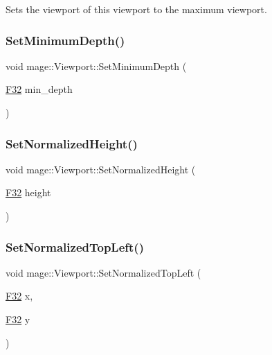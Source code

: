 Sets the viewport of this viewport to the maximum viewport. \hypertarget{classmage_1_1_viewport_a7e5ea28ca50be25d48668bd8ce4995d5}{}\label{classmage_1_1_viewport_a7e5ea28ca50be25d48668bd8ce4995d5} 
\subsubsection{\texorpdfstring{Set\+Minimum\+Depth()}{SetMinimumDepth()}}
{\footnotesize\ttfamily void mage\+::\+Viewport\+::\+Set\+Minimum\+Depth (\begin{DoxyParamCaption}\item[{\hyperlink{namespacemage_aa97e833b45f06d60a0a9c4fc22ae02c0}{F32}}]{min\+\_\+depth }\end{DoxyParamCaption})\hspace{0.3cm}{\ttfamily [noexcept]}}

\hypertarget{classmage_1_1_viewport_ad1516859277f8d872ce59e24dd525d5d}{}\label{classmage_1_1_viewport_ad1516859277f8d872ce59e24dd525d5d} 
\subsubsection{\texorpdfstring{Set\+Normalized\+Height()}{SetNormalizedHeight()}}
{\footnotesize\ttfamily void mage\+::\+Viewport\+::\+Set\+Normalized\+Height (\begin{DoxyParamCaption}\item[{\hyperlink{namespacemage_aa97e833b45f06d60a0a9c4fc22ae02c0}{F32}}]{height }\end{DoxyParamCaption})\hspace{0.3cm}{\ttfamily [noexcept]}}

\hypertarget{classmage_1_1_viewport_a6f85757d3b7e09e9e7cb72c201fd0cd4}{}\label{classmage_1_1_viewport_a6f85757d3b7e09e9e7cb72c201fd0cd4} 
\subsubsection{\texorpdfstring{Set\+Normalized\+Top\+Left()}{SetNormalizedTopLeft()}}
{\footnotesize\ttfamily void mage\+::\+Viewport\+::\+Set\+Normalized\+Top\+Left (\begin{DoxyParamCaption}\item[{\hyperlink{namespacemage_aa97e833b45f06d60a0a9c4fc22ae02c0}{F32}}]{x,  }\item[{\hyperlink{namespacemage_aa97e833b45f06d60a0a9c4fc22ae02c0}{F32}}]{y }\end{DoxyParamCaption})\hspace{0.3cm}{\ttfamily [noexcept]}}

